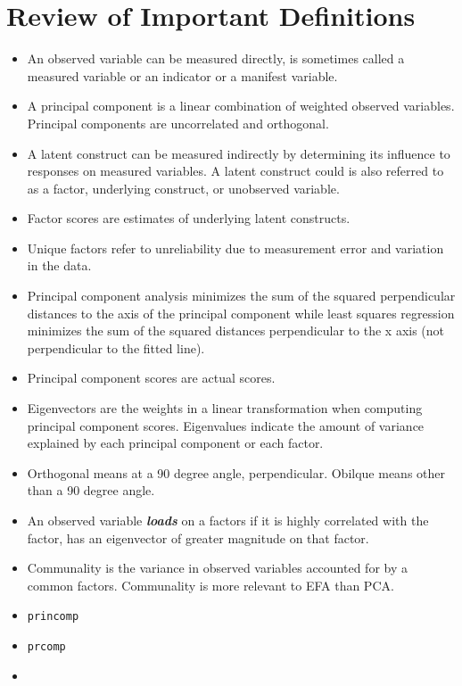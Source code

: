 \documentclass[]{article}
\begin{document}
\section{Review of Important Definitions}
\begin{itemize}
	\item An observed variable can be measured directly, is sometimes called a measured variable or an indicator or a
	manifest variable.
	\item A principal component is a linear combination of weighted observed variables. Principal components are
	uncorrelated and orthogonal.
	\item A latent construct can be measured indirectly by determining its influence to responses on measured variables. A latent construct could is also referred to as a factor, underlying construct, or unobserved variable.
	\item Factor scores are estimates of underlying latent constructs.
	\item Unique factors refer to unreliability due to measurement error and variation in the data.
	\item Principal component analysis minimizes the sum of the squared perpendicular distances to the axis of the
	principal component while least squares regression minimizes the sum of the squared distances perpendicular to the
	x axis (not perpendicular to the fitted line).
	\item Principal component scores are actual scores.
	\item Eigenvectors are the weights in a linear transformation when computing principal component scores.
	Eigenvalues indicate the amount of variance explained by each principal component or each factor.
	\item Orthogonal means at a 90 degree angle, perpendicular.
	Obilque means other than a 90 degree angle.
	\item An observed variable \textbf{\emph{loads}} on a factors if it is highly correlated with the factor, has an eigenvector of greater magnitude on that factor.
	\item Communality is the variance in observed variables accounted for by a common factors. Communality is more
	relevant to EFA than PCA.
\end{itemize}
\newpage

\begin{itemize}
	\item \texttt{princomp}
	\item \texttt{prcomp}
	\item
\end{itemize}
\newpage
\end{document}
